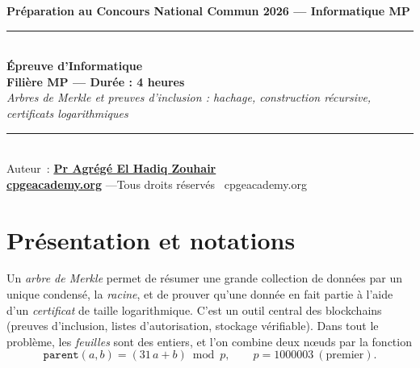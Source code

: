 \documentclass[11pt,a4paper]{article}
\begin{document}
\begin{center}
{\large\bfseries Préparation au Concours National Commun 2026 --- Informatique MP}\\[8pt]
\rule{0.9\linewidth}{0.5pt}\\[6pt]
{\Large\bfseries Épreuve d'Informatique}\\[4pt]
{\bfseries Filière MP --- Durée : 4 heures}\\[6pt]
{\itshape Arbres de Merkle et preuves d'inclusion : hachage, construction récursive, certificats logarithmiques}\\[6pt]
\rule{0.9\linewidth}{0.5pt}\\[8pt]
{\small Auteur~: \href{https://orcid.org/0000-0002-6108-7176}{\textbf{Pr Agrégé El Hadiq Zouhair}}}\\[3pt]
{\small \href{https://cpgeacademy.org}{\textbf{cpgeacademy.org}} \quad---\quad Tous droits réservés \textcopyright\ cpgeacademy.org}
\end{center}
\medskip
\begin{center}
\end{center}

\bigskip
\section*{Présentation et notations}

Un \emph{arbre de Merkle} permet de résumer une grande collection de données par un unique
condensé, la \emph{racine}, et de prouver qu'une donnée en fait partie à l'aide d'un
\emph{certificat} de taille logarithmique. C'est un outil central des blockchains (preuves
d'inclusion, listes d'autorisation, stockage vérifiable). Dans tout le problème, les
\emph{feuilles} sont des entiers, et l'on combine deux n\oe uds par la fonction
$$\mathtt{parent}(a,b) = (31\,a + b) \bmod p, \qquad p = 1000003 \ (\text{premier}).$$
\end{document}
